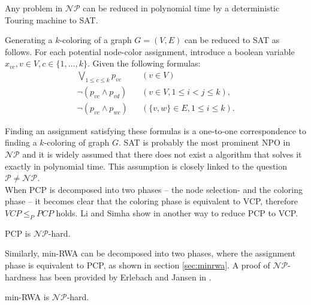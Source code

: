 \begin{theorem}
Any problem in $\mathcal{NP}$ can be reduced in polynomial time by a deterministic Touring machine to SAT.
\end{theorem}

Generating a $k$-coloring of a graph $G=(V,E)$ can be reduced to SAT as follows. For each potential node-color assignment, introduce a boolean variable $x_{vc}, v\in V, c\in \{1,\ldots ,k\}$. Given the following formulas:
\begin{align}
\bigvee_{1\leq c \leq k}p_{vc} && (v\in V)\\
\neg (p_{vc} \wedge p_{vd}) 		&& (v\in V, 1 \leq i < j \leq k),\\
\neg (p_{vc} \wedge p_{wc})		&& (\{v,w\}\in E, 1 \leq i \leq k).
\end{align}

Finding an assignment satisfying these formulas is a one-to-one correspondence to finding a $k$-coloring of graph $G$. SAT is probably the most prominent NPO in $\mathcal{NP}$ and it is widely assumed that there does not exist a algorithm that solves it exactly in polynomial time. This assumption is closely linked to the question $\mathcal{P} \neq \mathcal{NP}$.\\

When PCP is decomposed into two phases -- the node selection- and the coloring phase -- it becomes clear that the coloring phase is equivalent to VCP, therefore $VCP \leq_P PCP$ holds. Li and Simha show in \cite{li-00} another way to reduce PCP to VCP.

\begin{theorem}
PCP is $\mathcal{NP}$-hard.
\end{theorem}

Similarly, min-RWA can be decomposed into two phases, where the assignment phase is equivalent to PCP, as shown in section \ref{sec:minrwa}. A proof of $\mathcal{NP}$-hardness has been provided by Erlebach and Jansen in \cite{erlebach-01}.

\begin{theorem}
min-RWA is $\mathcal{NP}$-hard.
\end{theorem}